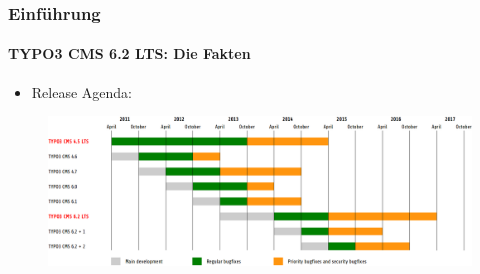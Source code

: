 
\begin{frame}[fragile]
	\frametitle{Einführung}
	\framesubtitle{TYPO3 CMS 6.2 LTS: Die Fakten}

	\begin{itemize}
		\item Release Agenda:
	\end{itemize}

	\begin{figure}
		\includegraphics[width=0.99\linewidth]{Images/Introduction/ReleaseAgenda.png}
	\end{figure}

\end{frame}


